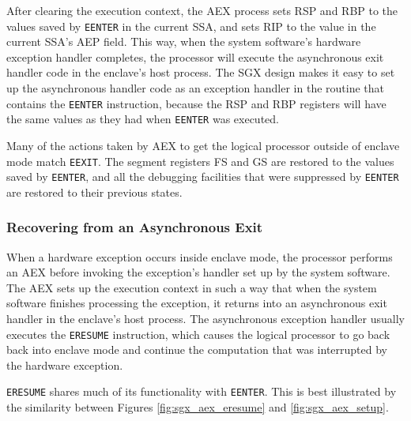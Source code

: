 After clearing the execution context, the AEX process sets RSP and RBP to the
values saved by \texttt{EENTER} in the current SSA, and sets RIP to the value
in the current SSA's AEP field. This way, when the system software's hardware
exception handler completes, the processor will execute the asynchronous exit
handler code in the enclave's host process. The SGX design makes it easy to
set up the asynchronous handler code as an exception handler in the routine
that contains the \texttt{EENTER} instruction, because the RSP and RBP
registers will have the same values as they had when \texttt{EENTER} was
executed.

Many of the actions taken by AEX to get the logical processor outside of
enclave mode match \texttt{EEXIT}. The segment registers FS and GS are restored
to the values saved by \texttt{EENTER}, and all the debugging facilities that
were suppressed by \texttt{EENTER} are restored to their previous states.


\subsubsection{Recovering from an Asynchronous Exit}
\label{sec:sgx_eresume}

When a hardware exception occurs inside enclave mode, the processor performs
an AEX before invoking the exception's handler set up by the system software.
The AEX sets up the execution context in such a way that when the system
software finishes processing the exception, it returns into an asynchronous
exit handler in the enclave's host process. The asynchronous exception handler
usually executes the \texttt{ERESUME} instruction, which causes the logical
processor to go back back into enclave mode and continue the computation that
was interrupted by the hardware exception.

\texttt{ERESUME} shares much of its functionality with \texttt{EENTER}. This is
best illustrated by the similarity between Figures
\ref{fig:sgx_aex_eresume} and \ref{fig:sgx_aex_setup}.

